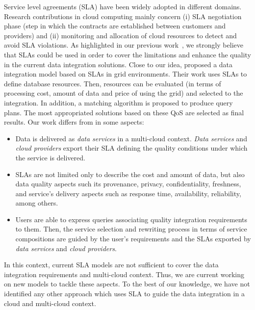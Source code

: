 Service level agreements (SLA) have been widely adopted in different domains. Research contributions in cloud computing mainly concern (i) SLA negotiation phase (step in which the contracts are established between customers and providers) and (ii) monitoring and allocation of cloud resources to detect and avoid SLA violations. As highlighted in our previous work~\cite{Carvalho2015}, we strongly believe that SLAs could be used in order to cover the limitations and enhance the quality in the current data integration solutions. Close to our idea, \cite{Nie07} proposed a data integration model based on SLAs in grid environments. Their work uses SLAs to define database resources. Then, resources can be evaluated (in terms of processing cost, amount of data and price of using the grid) and selected to the integration. In addition, a matching algorithm is proposed to produce query plans. The most appropriated solutions based on these QoS are selected as final results. Our work differs from \cite{Nie07} in some aspects: 
\begin{itemize}
\item Data is delivered as \textit{data services} in a multi-cloud context. \textit{Data services} and \textit{cloud providers} export their SLA defining the quality conditions under which the service is delivered.
\item SLAs are not limited only to describe the cost and amount of data, but also data quality aspects such its provenance, privacy, confidentiality, freshness, and service's delivery aspects such as response time, availability, reliability, among others.
\item Users are able to express queries associating quality integration requirements to them. Then, the service selection and rewriting process in terms of service compositions are guided by the user's requirements and the SLAs exported by \textit{data services} and \textit{cloud providers}.
\end{itemize}

In this context, current SLA models are not sufficient to cover the data integration requirements and multi-cloud context. Thus, we are current working on new models to tackle these aspects. To the best of our knowledge, we have not identified any other approach which uses SLA to guide the data integration in a cloud and multi-cloud context.
